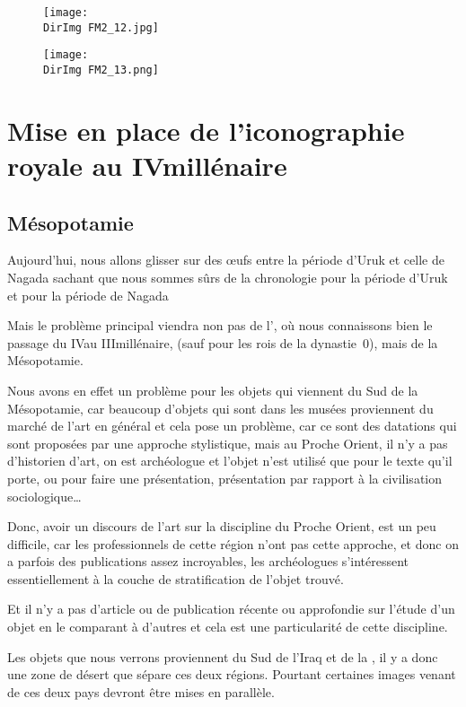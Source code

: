 \documentclass[a4paper,10pt]{article}
\newcommand{\DirImg}{../img/FaivreMartin/}
\begin{document}
\begin{figure}
  \centering
  \texttt{[image: \\DirImg FM2\_12.jpg]}
  \caption{}
  \label{}
\end{figure}

\begin{figure}
  \centering
  \texttt{[image: \\DirImg FM2\_13.png]}
  \caption{}
  \label{}
\end{figure}

\section{Mise en place de l'iconographie royale au IV\ieme millénaire}

\subsection{Mésopotamie}

Aujourd'hui, nous allons glisser sur des \oe{}ufs entre la période d'Uruk 
et celle de Nagada sachant que nous sommes sûrs de la chronologie pour la 
période d'Uruk et pour la période de Nagada

Mais le problème principal viendra non pas de l'\kmt, où nous connaissons 
bien le passage du IV\ieme au III\ieme millénaire, (sauf pour les rois de 
la dynastie~0), mais de la Mésopotamie.

Nous avons en effet un problème pour les objets qui viennent du Sud 
de la Mésopotamie, car beaucoup d'objets qui sont dans les musées 
proviennent du marché de l'art en général et cela pose un problème, 
car ce sont des datations qui sont proposées par une approche stylistique, 
mais au Proche Orient, il n'y a pas d'historien d'art, on est archéologue 
et l'objet n'est utilisé que pour le texte qu'il porte, ou pour faire une 
présentation, présentation par rapport à la civilisation sociologique\dots

Donc, avoir un discours de l'art sur la discipline du Proche Orient, 
est un peu difficile, car les professionnels de cette région n'ont pas 
cette approche, et donc on a parfois des publications assez incroyables, 
les archéologues s'intéressent essentiellement à la couche de 
stratification de l'objet trouvé.

Et il n'y a pas d'article ou de publication récente ou approfondie 
sur l'étude d'un objet en le comparant à d'autres et cela est une 
particularité de cette discipline.

Les objets que nous verrons proviennent du Sud de l'Iraq et de la \HE, 
il y a donc une zone de désert que sépare ces deux régions. Pourtant 
certaines images venant de ces deux pays devront être mises en parallèle.
\end{document}
